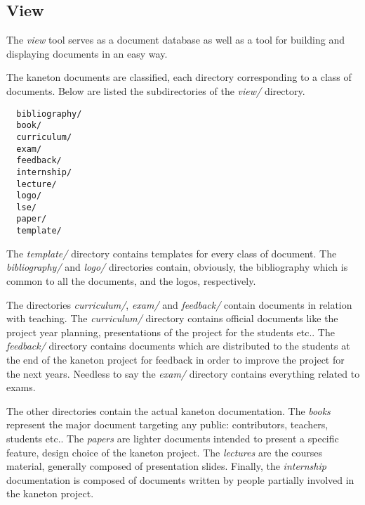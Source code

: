%
%
%
%
%
%

%
%

\subsection{View}

The \textit{view} tool serves as a document database as well as a tool for
building and displaying documents in an easy way.

The kaneton documents are classified, each directory corresponding to a
class of documents. Below are listed the subdirectories of the \textit{view/}
directory.

\begin{verbatim}
  bibliography/
  book/
  curriculum/
  exam/
  feedback/
  internship/
  lecture/
  logo/
  lse/
  paper/
  template/
\end{verbatim}

The \textit{template/} directory contains templates for every class of
document. The \textit{bibliography/} and \textit{logo/} directories contain,
obviously, the bibliography which is common to all the documents, and the
logos, respectively.

The directories \textit{curriculum/}, \textit{exam/} and \textit{feedback/}
contain documents in relation with teaching. The \textit{curriculum/}
directory contains official documents like the project year planning,
presentations of the project for the students etc.. The
\textit{feedback/} directory contains documents which are distributed to the
students at the end of the kaneton project for feedback in order to improve
the project for the next years. Needless to say the \textit{exam/} directory
contains everything related to exams.

The other directories contain the actual kaneton documentation. The
\textit{books} represent the major document targeting any public:
contributors, teachers, students etc.. The \textit{papers} are lighter
documents intended to present a specific feature, design choice of the kaneton
project. The \textit{lectures} are the courses material, generally composed of
presentation slides. Finally, the \textit{internship} documentation is
composed of documents written by people partially involved in the kaneton
project.


